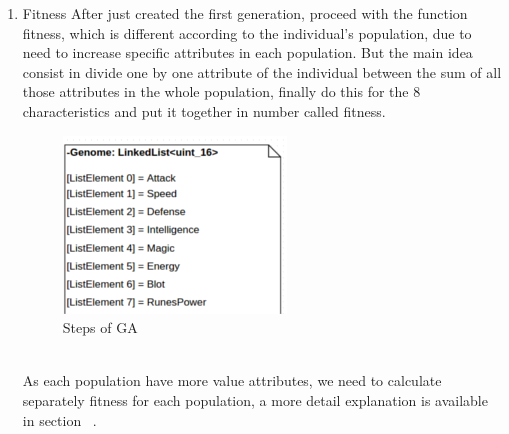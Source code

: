 \documentclass[twocolumn]{IEEEtran}
\begin{document}
\begin{enumerate} 
	\item Fitness
    After just created the first generation, proceed with the function fitness, which is different 
    according to the individual's population, due to need to increase specific attributes in each 	
    population. But the main idea consist in divide one by one attribute of the individual between the 
    sum of all those attributes in the whole population, finally do this for the 8 characteristics and 
    put it together in number called fitness. 
        \begin{figure}[h!]
        \centering
        \includegraphics[width=\columnwidth]{src/cualidades.png}
		\caption{Steps of GA}
		\end{figure}\\
    As each population have more value attributes, we need to calculate separately fitness for each  
    population, a more detail explanation is available in section ~.
        

\end{enumerate}
\end{document}
